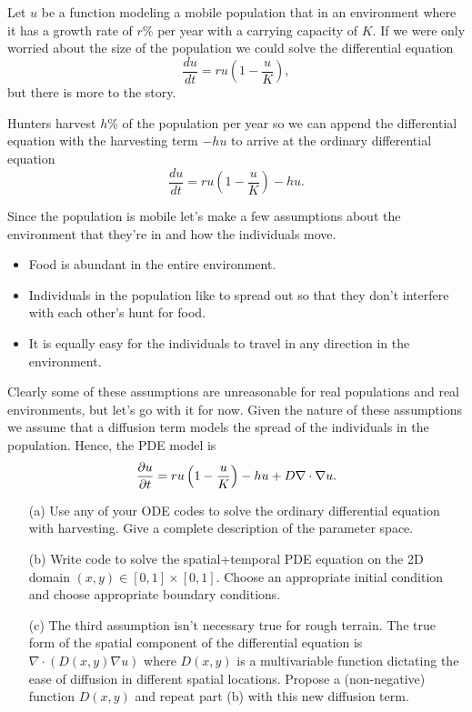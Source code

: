 \begin{problem}
    Let $u$ be a function modeling a mobile population that in an environment where it has a growth rate of
    $r\%$ per year with a carrying capacity of $K$.  If we were only worried about the
    size of the population we could solve the differential equation 
    \[ \frac{du}{dt} = ru \left( 1-\frac{u}{K} \right), \]
    but there is more to the story.  
    
    Hunters harvest $h$\% of the population per year so we can append the differential
    equation with the harvesting term $-h u$ to arrive at the ordinary differential
    equation 
    \[ \frac{du}{dt} = ru \left( 1-\frac{u}{K} \right) - hu. \]

    Since the population is mobile let's make a few assumptions about the environment that
    they're in and how the individuals move.
    \begin{itemize}
        \item Food is abundant in the entire environment.
        \item Individuals in the population like to spread out so that they don't
            interfere with each other's hunt for food.
        \item It is equally easy for the individuals to travel in any direction in the
            environment.
    \end{itemize}
    Clearly some of these assumptions are unreasonable for real populations and real
    environments, but let's go with it for now.  Given the nature of these assumptions we
    assume that a diffusion term models the spread of the individuals in the population.
    Hence, the PDE model is
    \[ \frac{\partial{u}}{\partial{t}} = ru\left( 1-\frac{u}{K} \right) - hu + D \nabla \cdot \nabla u. \]
    \begin{enumerate}
        \item[(a)] Use any of your ODE codes to solve the ordinary differential equation
            with harvesting.  Give a complete description of the parameter space.
        \item[(b)] Write code to solve the spatial+temporal PDE equation on the 2D domain
            $(x,y) \in [0,1] \times [0,1]$.  Choose an appropriate initial condition and
            choose appropriate boundary conditions.
        \item[(c)] The third assumption isn't necessary true for rough terrain. The true
            form of the spatial component of the differential equation is $\nabla \cdot
            \left( D(x,y) \nabla u \right)$ where $D(x,y)$ is a multivariable function
            dictating the ease of diffusion in different spatial locations.  Propose a
            (non-negative) function $D(x,y)$ and repeat part (b) with this new diffusion
            term.
    \end{enumerate}
\end{problem}


